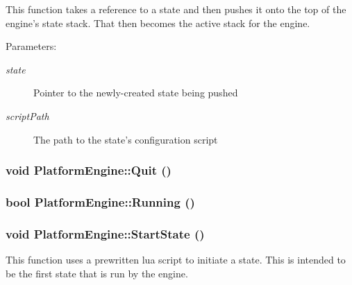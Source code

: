 This function takes a reference to a state and then pushes it onto the top of the engine's state stack. That then becomes the active stack for the engine.

\begin{Desc}
\item[Parameters:]
\begin{description}
\item[{\em state}]Pointer to the newly-created state being pushed \item[{\em scriptPath}]The path to the state's configuration script \end{description}
\end{Desc}
\hypertarget{class_platform_engine_dbcdd91813cabbe51bb2f86eb23e772a}{
\subsubsection[{Quit}]{\setlength{\rightskip}{0pt plus 5cm}void PlatformEngine::Quit ()}}
\label{db/da1/class_platform_engine_dbcdd91813cabbe51bb2f86eb23e772a}


\hypertarget{class_platform_engine_31ec37c0222f4694cc3c0e819e143038}{
\subsubsection[{Running}]{\setlength{\rightskip}{0pt plus 5cm}bool PlatformEngine::Running ()}}
\label{db/da1/class_platform_engine_31ec37c0222f4694cc3c0e819e143038}


\hypertarget{class_platform_engine_8420fc9a24a0fed565af76f7bb378bdf}{
\subsubsection[{StartState}]{\setlength{\rightskip}{0pt plus 5cm}void PlatformEngine::StartState ()}}
\label{db/da1/class_platform_engine_8420fc9a24a0fed565af76f7bb378bdf}


This function uses a prewritten lua script to initiate a state. This is intended to be the first state that is run by the engine. 

